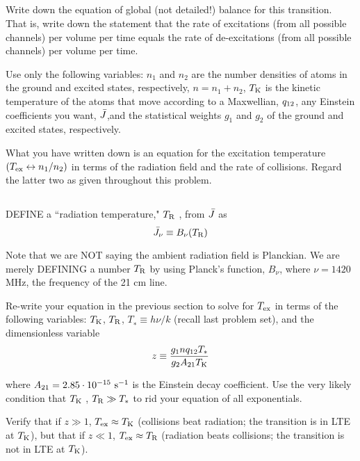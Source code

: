 \documentclass[11pt]{article}
\begin{document}
\def\TK{{T_{\rm K}}}
\def\TR{{T_{\rm R}}}
\subsection{} Write down the equation of global (not detailed!) balance for
this transition. That is, write down the statement that the rate of excitations
(from all possible channels) per volume per time equals the rate of
de-excitations (from all possible channels) per volume per time.

Use only the following variables: $n_1$ and $n_2$ are the number densities of atoms
in the ground and excited states, respectively, $n = n_1 + n_2$, $\TK$ is the kinetic
temperature of the atoms that move according to a Maxwellian, ${q_{12}}$, any Einstein
coefficients you want, ${\bar J}$,and the statistical weights $g_1$ and $g_2$
of the ground and excited states, respectively. 

What you have written down is an equation for the excitation temperature 
$({T_{\rm ex}}\leftrightarrow n_1/n_2)$
in terms of the radiation field and the rate of collisions. Regard the
latter two as given throughout this problem.

\subsection{} DEFINE a ``radiation temperature," $\TR$ , from ${\bar J}$ as
\begin{equation}
\Jbar_\nu\equiv B_\nu(\TR)
\end{equation}

Note that we are NOT saying the ambient radiation field is Planckian. We are
merely DEFINING a number $\TR$ by using Planck's function, $B_\nu$, 
where $\nu=1420$ MHz,
the frequency of the 21 cm line.

Re-write your equation in the previous section to solve for ${T_{\rm ex}}$ in terms of the following
variables: $\TK$, $\TR$, $T_∗\equiv h\nu/k$ (recall last problem set), and the dimensionless
variable
\begin{equation}
z\equiv\frac{g_1 n\qot T_*}{g_2 A_{21}\TK}
\end{equation}

where ${A_{21}}=2.85\cdot10^{-15}~{\rm s}^{-1}$ is the Einstein decay coefficient.
Use the very likely condition that $\TK$ , $\TR\gg T_*$ to rid your equation of all
exponentials.

Verify that if $z\gg1$, $\Tex\approx\TK$ (collisions beat radiation; the transition is in
LTE at $\TK$), but that if $z\ll1$, $\Tex\approx\TR$ (radiation beats collisions; the
transition is not in LTE at $\TK$).
\end{document}
